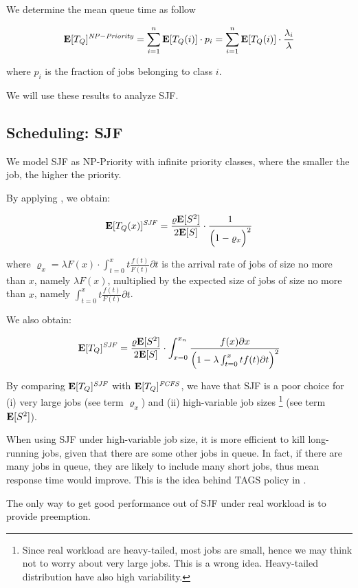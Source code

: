 We determine the mean queue time as follow

\begin{equation}
\label{eqn:NP-Priority-Queue-Time}
\expected{T_{Q}}^{\mathit{NP-Priority}}=\sum_{i=1}^{n}\expected{T_{Q}(i)}\cdot p_{i}=\sum_{i=1}^{n}\expected{T_{Q}(i)}\cdot\frac{\lambda_{i}}{\lambda}
\end{equation}

where $p_{i}$ is the fraction of jobs belonging to class $i$.

We will use these results to analyze SJF.




\subsection{Scheduling: SJF}
\label{sec:Scheduling-SJF}

We model SJF as NP-Priority with infinite priority classes, where the smaller the job, the higher the priority.

By applying , we obtain:

\begin{equation}
\label{eqn:SJF-Queue-Time-Size}
\expected{T_{Q}(x)}^{\mathit{SJF}}=
\frac{\varrho\expected{S^{2}}}{2\expected{S}}\cdot\frac{1}{\Big(1-\varrho_{x}\Big)^{2}}
\end{equation}

where $\varrho_{x}=\lambda F(x)\cdot\int_{t=0}^{x}t\frac{f(t)}{F(t)}\partial t$ is the arrival rate of jobs of size no more than $x$, namely $\lambda F(x)$, multiplied by the expected size of jobs of size no more than $x$, namely $\int_{t=0}^{x}t\frac{f(t)}{F(t)}\partial t$.

We also obtain:

\begin{equation}
\label{eqn:SJF-Queue-Time}
\expected{T_{Q}}^{\mathit{SJF}}=
\frac{\varrho\expected{S^{2}}}{2\expected{S}}\cdot\int_{x=0}^{x_{n}}\frac{f(x)\partial x}{\Big(1-\lambda\int_{t=0}^{x}tf(t)\partial t\Big)^{2}}
\end{equation}

By comparing $\mathbf{E}[T_{Q}]^{\mathit{SJF}}$ with $\mathbf{E}[T_{Q}]^{\mathit{FCFS}}$, we have that SJF is a poor choice for (i) very large jobs (see term $\varrho_{x}$) and (ii) high-variable job sizes \footnote{Since real workload are heavy-tailed, most jobs are small, hence we may think not to worry about very large jobs. This is a wrong idea. Heavy-tailed distribution have also high variability.} (see term $\mathbf{E}[S^{2}]$).

When using SJF under high-variable job size, it is more efficient to kill long-running jobs, given that there are some other jobs in queue. In fact, if there are many jobs in queue, they are likely to include many short jobs, thus mean response time would improve. This is the idea behind TAGS policy in \cite{harchol2000task}. 

The only way to get good performance out of SJF under real workload is to provide preemption.
